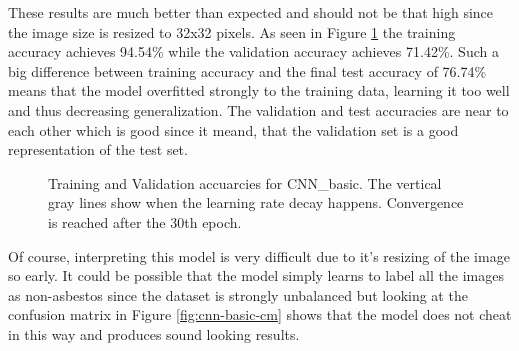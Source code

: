 \quad


These results are much better than expected and should not be that high since the image size is resized to 32x32 pixels. As seen in Figure \ref{fig:cnn-basic} the training accuracy achieves 94.54\% while the validation accuracy achieves 71.42\%. Such a big difference between training accuracy and the final test accuracy of 76.74\% means that the model overfitted strongly to the training data, learning it too well and thus decreasing generalization. The validation and test accuracies are near to each other which is good since it meand, that the validation set is a good representation of the test set.\\


\begin{figure}[h]
\centering
\caption{Training and Validation accuarcies for CNN\_basic. The vertical gray lines show when the learning rate decay happens. Convergence is reached after the 30th epoch.}
\label{fig:cnn-basic}
\end{figure}

\quad

Of course, interpreting this model is very difficult due to it's resizing of the image so early. It could be possible that the model simply learns to label all the images as non-asbestos since the dataset is strongly unbalanced but looking at the confusion matrix in Figure \ref{fig:cnn-basic-cm} shows that the model does not cheat in this way and produces sound looking results. \\


